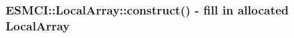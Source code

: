  
\setlength{\oldparskip}{\parskip}
\setlength{\parskip}{1.5ex}
\setlength{\oldparindent}{\parindent}
\setlength{\parindent}{0pt}
\setlength{\oldbaselineskip}{\baselineskip}
\setlength{\baselineskip}{11pt}
 
\def\bv{\begin{verbatim}}
\def\ev{\end{verbatim}}
\def\be{\begin{equation}}
\def\ee{\end{equation}}
\def\bea{\begin{eqnarray}}
\def\eea{\end{eqnarray}}
\def\bi{\begin{itemize}}
\def\ei{\end{itemize}}
\def\bn{\begin{enumerate}}
\def\en{\end{enumerate}}
\def\bd{\begin{description}}
\def\ed{\end{description}}
\def\({\left (}
\def\){\right )}
\def\[{\left [}
\def\]{\right ]}
\def\<{\left  \langle}
\def\>{\right \rangle}
\def\cI{{\cal I}}
\def\diag{\mathop{\rm diag}}
\def\tr{\mathop{\rm tr}}


 
\subsubsection [ESMCI::LocalArray::construct()] {ESMCI::LocalArray::construct() - fill in allocated LocalArray}


